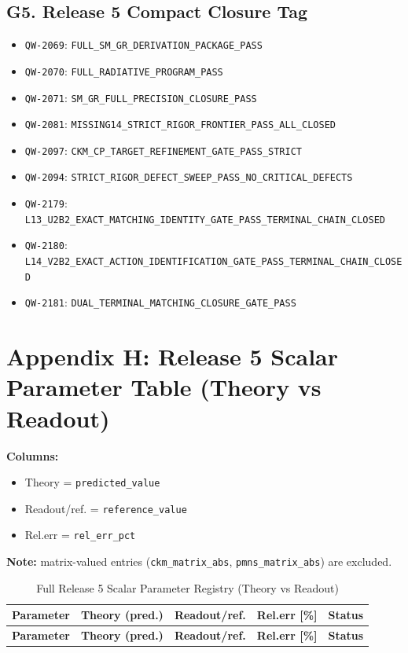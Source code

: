 \documentclass[11pt,a4paper]{article}
\newcommand{\QW}[1]{\texttt{QW-#1}}
\newcommand{\Verdict}[1]{\texttt{#1}}
\begin{document}
\subsection{G5. Release 5 Compact Closure Tag}
\label{sec:g6_release5_update}
\begin{itemize}[leftmargin=1.4em]
    \item \QW{2069}: \Verdict{FULL\_SM\_GR\_DERIVATION\_PACKAGE\_PASS}
    \item \QW{2070}: \Verdict{FULL\_RADIATIVE\_PROGRAM\_PASS}
    \item \QW{2071}: \Verdict{SM\_GR\_FULL\_PRECISION\_CLOSURE\_PASS}
    \item \QW{2081}: \Verdict{MISSING14\_STRICT\_RIGOR\_FRONTIER\_PASS\_ALL\_CLOSED}
    \item \QW{2097}: \Verdict{CKM\_CP\_TARGET\_REFINEMENT\_GATE\_PASS\_STRICT}
    \item \QW{2094}: \Verdict{STRICT\_RIGOR\_DEFECT\_SWEEP\_PASS\_NO\_CRITICAL\_DEFECTS}
    \item \QW{2179}: \Verdict{L13\_U2B2\_EXACT\_MATCHING\_IDENTITY\_GATE\_PASS\_TERMINAL\_CHAIN\_CLOSED}
    \item \QW{2180}: \Verdict{L14\_V2B2\_EXACT\_ACTION\_IDENTIFICATION\_GATE\_PASS\_TERMINAL\_CHAIN\_CLOSED}
    \item \QW{2181}: \Verdict{DUAL\_TERMINAL\_MATCHING\_CLOSURE\_GATE\_PASS}
\end{itemize}

\section{Appendix H: Release 5 Scalar Parameter Table (Theory vs Readout)}
\label{sec:appendix_h_param_table}

\textbf{Columns:}
\begin{itemize}[leftmargin=1.4em]
    \item Theory = \texttt{predicted\_value}
    \item Readout/ref. = \texttt{reference\_value}
    \item Rel.err = \texttt{rel\_err\_pct}
\end{itemize}

\textbf{Note:} matrix-valued entries (\texttt{ckm\_matrix\_abs}, \texttt{pmns\_matrix\_abs}) are excluded.

\begin{longtable}{|p{3.8cm}|p{3.0cm}|p{3.0cm}|p{2.2cm}|p{3.3cm}|}
\caption{Full Release 5 Scalar Parameter Registry (Theory vs Readout)}\label{tab:full_release5_scalar_registry}\\
\hline
\textbf{Parameter} & \textbf{Theory (pred.)} & \textbf{Readout/ref.} & \textbf{Rel.err [\%]} & \textbf{Status} \\
\hline
\endfirsthead
\hline
\textbf{Parameter} & \textbf{Theory (pred.)} & \textbf{Readout/ref.} & \textbf{Rel.err [\%]} & \textbf{Status} \\
\hline
\endhead

\end{longtable}
\end{document}
